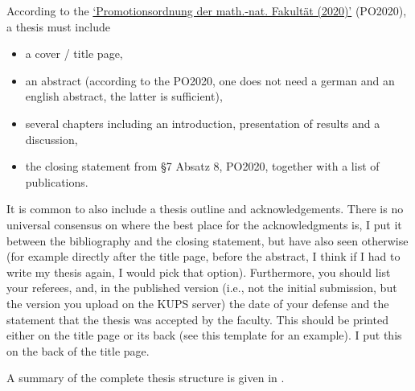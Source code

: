 According to the \href{https://mathnat.uni-koeln.de/sites/dekanat/official/Ordnungen/Promotionsordnung_2020.pdf}{`Promotionsordnung der math.-nat. Fakultät (2020)'} (PO2020), a thesis must include
\begin{itemize}
	\item a cover / title page,
	\item an abstract (according to the PO2020, one does not need a german and an english abstract, the latter is sufficient),
	\item several chapters including an introduction, presentation of results and a discussion,
	\item the closing statement from §7 Absatz 8, PO2020, together with a list of publications.
\end{itemize}
It is common to also include a thesis outline and acknowledgements. There is no universal consensus on where the best place for the acknowledgments is, I put it between the bibliography and the closing statement, but have also seen otherwise (for example directly after the title page, before the abstract, I think if I had to write my thesis again, I would pick that option).
Furthermore, you should list your referees, and, in the published version (i.e., not the initial submission, but the version you upload on the KUPS server) the date of your defense and the statement that the thesis was accepted by the faculty. This should be printed either on the title page or its back (see this template for an example). I put this on the back of the title page.

A summary of the complete thesis structure is given in .

